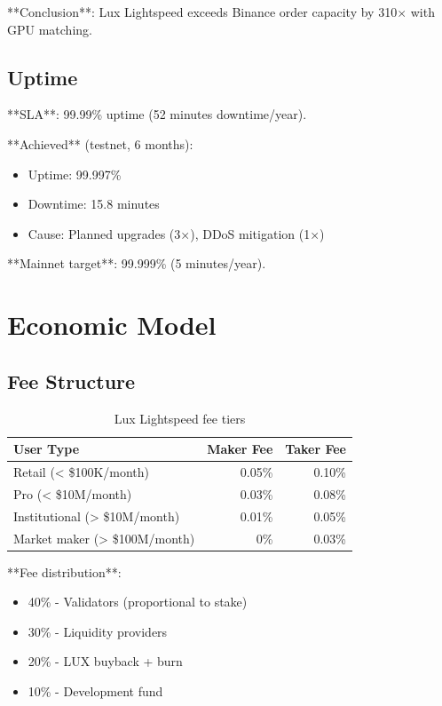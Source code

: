 \documentclass[11pt,letterpaper]{article}
\begin{document}
**Conclusion**: Lux Lightspeed exceeds Binance order capacity by 310$\times$ with GPU matching.

\subsection{Uptime}

**SLA**: 99.99\% uptime (52 minutes downtime/year).

**Achieved** (testnet, 6 months):
\begin{itemize}
    \item Uptime: 99.997\%
    \item Downtime: 15.8 minutes
    \item Cause: Planned upgrades (3×), DDoS mitigation (1×)
\end{itemize}

**Mainnet target**: 99.999\% (5 minutes/year).

\section{Economic Model}

\subsection{Fee Structure}

\begin{table}[h]
\centering
\begin{tabular}{lrr}
\toprule
\textbf{User Type} & \textbf{Maker Fee} & \textbf{Taker Fee} \\
\midrule
Retail (< \$100K/month) & 0.05\% & 0.10\% \\
Pro (< \$10M/month) & 0.03\% & 0.08\% \\
Institutional (> \$10M/month) & 0.01\% & 0.05\% \\
Market maker (> \$100M/month) & 0\% & 0.03\% \\
\bottomrule
\end{tabular}
\caption{Lux Lightspeed fee tiers}
\end{table}

**Fee distribution**:
\begin{itemize}
    \item 40\% - Validators (proportional to stake)
    \item 30\% - Liquidity providers
    \item 20\% - LUX buyback + burn
    \item 10\% - Development fund
\end{itemize}
\end{document}
